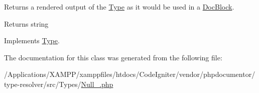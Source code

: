 Returns a rendered output of the \mbox{\hyperlink{interfacephp_documentor_1_1_reflection_1_1_type}{Type}} as it would be used in a \mbox{\hyperlink{classphp_documentor_1_1_reflection_1_1_doc_block}{Doc\+Block}}.

\begin{DoxyReturn}{Returns}
string 
\end{DoxyReturn}


Implements \mbox{\hyperlink{interfacephp_documentor_1_1_reflection_1_1_type_a7516ca30af0db3cdbf9a7739b48ce91d}{Type}}.



The documentation for this class was generated from the following file\+:\begin{DoxyCompactItemize}
\item 
/\+Applications/\+X\+A\+M\+P\+P/xamppfiles/htdocs/\+Code\+Igniter/vendor/phpdocumentor/type-\/resolver/src/\+Types/\mbox{\hyperlink{_null___8php}{Null\+\_\+.\+php}}\end{DoxyCompactItemize}
